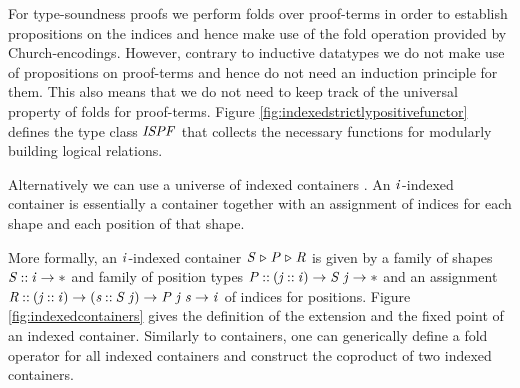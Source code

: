 For type-soundness proofs we perform folds over proof-terms in order
to establish propositions on the indices and hence make use of the
fold operation provided by Church-encodings. However, contrary to
inductive datatypes we do not make use of propositions on proof-terms
and hence do not need an induction principle for them. This also means
that we do not need to keep track of the universal property of folds
for proof-terms. Figure \ref{fig:indexedstrictlypositivefunctor}
defines the type class \ensuremath{\Conid{ISPF}} that collects the necessary functions
for modularly building logical relations.

Alternatively we can use a universe of indexed containers
\cite{indexedcontainers}. An \ensuremath{\Varid{i}}-indexed container is essentially a
container together with an assignment of indices for each shape and
each position of that shape.

More formally, an \ensuremath{\Varid{i}}-indexed container \ensuremath{\Conid{S}{\;\triangleright\;}\Conid{P}{\;\triangleright\;}\Conid{R}} is given by a
family of shapes \ensuremath{\Conid{S}\mathbin{::}\Varid{i}\to \mathbin{*}} and family of position types \ensuremath{\Conid{P}\mathbin{::}(\Varid{j}\mathbin{::}\Varid{i})\to \Conid{S}\;\Varid{j}\to \mathbin{*}} and an assignment \ensuremath{\Conid{R}\mathbin{::}(\Varid{j}\mathbin{::}\Varid{i})\to (\Varid{s}\mathbin{::}\Conid{S}\;\Varid{j})\to \Conid{P}\;\Varid{j}\;\Varid{s}\to \Varid{i}} of indices for positions. Figure \ref{fig:indexedcontainers}
gives the definition of the extension and the fixed point of an
indexed container. Similarly to containers, one can generically define
a fold operator for all indexed containers and construct the coproduct
of two indexed containers.

